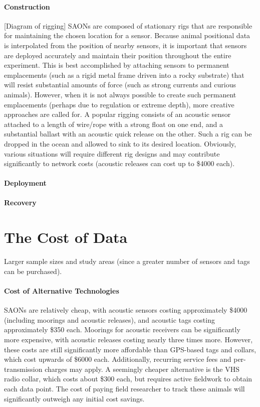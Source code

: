 \paragraph{Construction}
[Diagram of rigging]
SAONs are composed of stationary rigs that are responsible for maintaining the chosen location for a sensor.  Because animal positional data is interpolated from the position of nearby sensors, it is important that sensors are deployed accurately and maintain their position throughout the entire experiment.  This is best accomplished by attaching sensors to permanent emplacements  (such as a rigid metal frame driven into a rocky substrate) that will resist substantial amounts of force (such as strong currents and curious animals).  However, when it is not always possible to create such permanent emplacements (perhaps due to regulation or extreme depth), more creative approaches are called for.  A popular rigging consists of an acoustic sensor attached to a length of wire/rope with a strong float on one end, and a substantial ballast with an acoustic quick release on the other.  Such a rig can be dropped in the ocean and allowed to sink to its desired location.  Obviously, various situations will require different rig designs and may contribute significantly to network costs (acoustic releases can cost up to \$4000 each).

\paragraph{Deployment}


\paragraph{Recovery}


\section{The Cost of Data}
Larger sample sizes and study areas (since a greater number of sensors and tags can be purchased).  


\paragraph{Cost of Alternative Technologies}
SAONs are relatively cheap, with acoustic sensors costing approximately \$4000 (including moorings and acoustic releases), and acoustic tags costing approximately \$350 each.  Moorings for acoustic receivers can be significantly more expensive, with acoustic releases costing nearly three times more.  However, these costs are still significantly more affordable than GPS-based tags and collars, which cost upwards of \$6000 each.  Additionally, recurring service fees and per-transmission charges may apply.  A seemingly cheaper alternative is the VHS radio collar, which costs about \$300 each, but requires active fieldwork to obtain each data point.  The cost of paying field researcher to track these animals will significantly outweigh any initial cost savings.  


